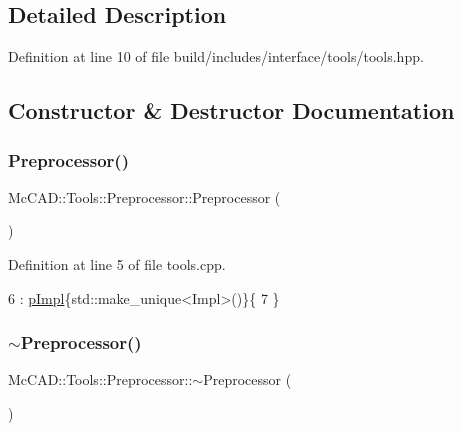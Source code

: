 \subsection{Detailed Description}


Definition at line 10 of file build/includes/interface/tools/tools.\+hpp.



\subsection{Constructor \& Destructor Documentation}
\mbox{\label{classMcCAD_1_1Tools_1_1Preprocessor_a53fbaa9570b7fc8832712eb634402d23}} 
\subsubsection{\texorpdfstring{Preprocessor()}{Preprocessor()}\hspace{0.1cm}{\footnotesize\ttfamily [1/2]}}
{\footnotesize\ttfamily Mc\+C\+A\+D\+::\+Tools\+::\+Preprocessor\+::\+Preprocessor (\begin{DoxyParamCaption}{ }\end{DoxyParamCaption})}



Definition at line 5 of file tools.\+cpp.


\begin{DoxyCode}
6   : \hyperlink{classMcCAD_1_1Tools_1_1Preprocessor_acd2ccc9134184b465a4ea2de5df90468}{pImpl}\{std::make\_unique<Impl>()\}\{
7 \}
\end{DoxyCode}
\mbox{\label{classMcCAD_1_1Tools_1_1Preprocessor_a7d2535e0da6d09c5b6a6e83f20c6a054}} 
\subsubsection{\texorpdfstring{$\sim$\+Preprocessor()}{~Preprocessor()}\hspace{0.1cm}{\footnotesize\ttfamily [1/2]}}
{\footnotesize\ttfamily Mc\+C\+A\+D\+::\+Tools\+::\+Preprocessor\+::$\sim$\+Preprocessor (\begin{DoxyParamCaption}{ }\end{DoxyParamCaption})}



